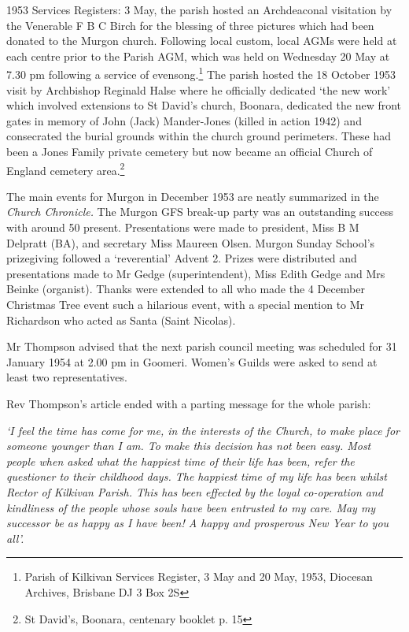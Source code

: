 1953 Services Registers: 3 May, the parish hosted an Archdeaconal visitation by the Venerable F B C Birch for the blessing of three pictures which had been donated to the Murgon church. Following local custom, local AGMs were held at each centre prior to the Parish AGM, which was held on Wednesday 20 May at 7.30 pm following a service of evensong.\footnote{Parish of Kilkivan Services Register, 3 May and 20 May, 1953, Diocesan Archives, Brisbane DJ 3 Box 2S} The parish hosted the 18 October 1953 visit by Archbishop Reginald Halse where he officially dedicated `the new work' which involved extensions to St David's church, Boonara, dedicated the new front gates in memory of John (Jack) Mander-Jones (killed in action 1942) and consecrated the burial grounds within the church ground perimeters. These had been a Jones Family private cemetery but now became an official Church of England cemetery area.\footnote{St David's, Boonara, centenary booklet p. 15}

The main events for Murgon in December 1953 are neatly summarized in the \emph{Church Chronicle.} The Murgon GFS break-up party was an outstanding success with around 50 present. Presentations were made to president, Miss B M Delpratt (BA), and secretary Miss Maureen Olsen. Murgon Sunday School's prizegiving followed a `reverential' Advent 2. Prizes were distributed and presentations made to Mr Gedge (superintendent), Miss Edith Gedge and Mrs Beinke (organist). Thanks were extended to all who made the 4 December Christmas Tree event such a hilarious event, with a special mention to Mr Richardson who acted as Santa (Saint Nicolas).

Mr Thompson advised that the next parish council meeting was scheduled for 31 January 1954 at 2.00 pm in Goomeri. Women's Guilds were asked to send at least two representatives.

Rev Thompson's article ended with a parting message for the whole parish:

\emph{`I feel the time has come for me, in the interests of the Church, to make place for someone younger than I am. To make this decision has not been easy. Most people when asked what the happiest time of their life has been, refer the questioner to their childhood days. The happiest time of my life has been whilst Rector of Kilkivan Parish. This has been effected by the loyal co-operation and kindliness of the people whose souls have been entrusted to my care. May my successor be as happy as I have been! A happy and prosperous New Year to you all'.}

